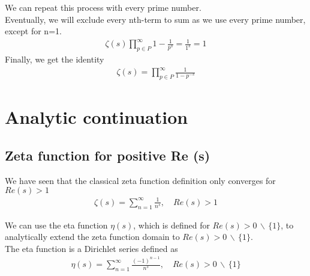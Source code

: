 \documentclass{article}
\newcommand{\exceptone}{
    \,\backslash\,\{1\}
}
\begin{document}
We can repeat this process with every prime number.
\\
Eventually, we will exclude every nth-term to sum as we use every prime number, except for n=1.
\begin{align*}
    \zeta(s)\prod_{p\in P}^{\infty}1-\frac{1}{p^s}=\frac{1}{1^s}=1
\end{align*}
Finally, we get the identity
\begin{align*}
    \zeta(s)=
    \prod_{p\in P}^{\infty}\frac{1}{1-p^{-s}}
\end{align*}

\pagebreak

\section{Analytic continuation}

\subsection{Zeta function for positive Re (s)}

We have seen that the classical zeta function definition only converges for \(Re(s)>1\)
\begin{align*}
    \zeta(s)=\sum_{n=1}^{\infty}\frac{1}{n^s},
    \quad Re(s)>1
\end{align*}

We can use the eta function \(\eta(s)\), which is defined for \(Re(s)>0\exceptone\), to analytically extend the zeta function domain to \(Re(s)>0\exceptone\).
\\
The eta function is a Dirichlet series defined as
\begin{align*}
    \eta(s)=\sum_{n=1}^{\infty}\frac{{(-1)}^{n-1}}{n^s},
    \quad Re(s)>0\exceptone
\end{align*}
\end{document}
